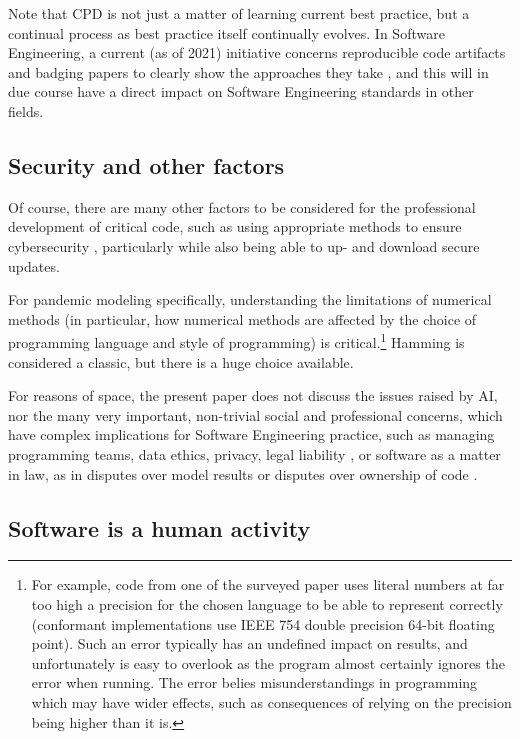 \documentclass[10pt,a4paper]{article}
\begin{document}
Note that CPD is not just a matter of learning current best practice, but a continual process as best practice itself continually evolves. {In Software Engineering, a current (as of 2021) initiative concerns reproducible code artifacts and badging papers to clearly show the approaches they take \cite{acm-artifacts}, and this will in due course have a direct impact on Software Engineering standards in other fields.}

\subsection{Security and other factors}
Of course, there are many other factors to be considered for the professional development of critical code, such as using appropriate methods to ensure cybersecurity \cite{security-engineering,cyber-cacm}, particularly while also being able to up- and download secure updates.

For pandemic modeling specifically, understanding the limitations of numerical methods (in particular, how numerical methods are affected by the choice of programming language and style of programming) is critical.\footnote{{For example, code from one of the surveyed paper \cite{example-numerical-error} uses literal numbers at far too high a precision for the chosen language to be able to represent correctly (conformant implementations use IEEE 754 double precision 64-bit floating point). Such an error typically has an undefined impact on results, and unfortunately is easy to overlook as the program almost certainly ignores the error when running. The error belies misunderstandings in programming which may have wider effects, such as consequences of relying on the precision being higher than it is.}} Hamming \cite{hamming} is considered a classic, but there is a huge choice available.

{For reasons of space, the present paper does not discuss the issues raised by AI, nor the many very important, non-trivial social and professional concerns, which have complex implications for Software Engineering practice, such as managing programming teams, data ethics, privacy, legal liability \cite{Schneier}, or software as a matter in law, as in disputes over model results or disputes over ownership of code \cite{electronic-evidence}.}

\subsection{Software is a human activity}
\end{document}
